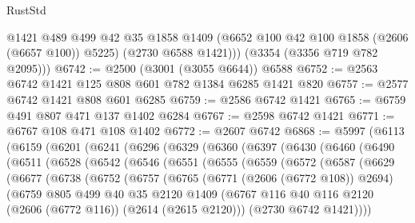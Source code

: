 \begin{lexlean}{RustStd}
\begin{coremodule}
          @1421
          @489
          @499
          @42
          @35
          @1858
          @1409
          (@6652 @100 @42 @100 @1858 (@2606 (@6657 @100)) @5225)
          (@2730 @6588 @1421)))
      (@3354 (@3356 @719 @782 @2095)))
@6742 := @2500 (@3001 (@3055 @6644)) @6588
@6752 := @2563 @6742 @1421 @125 @808 @601 @782 @1384 @6285 @1421 @820
@6757 := @2577 @6742 @1421 @808 @601 @6285
@6759 := @2586 @6742 @1421
@6765 := @6759 @491 @807 @471 @137 @1402 @6284
@6767 := @2598 @6742 @1421
@6771 := @6767 @108 @471 @108 @1402
@6772 := @2607 @6742
@6868 := @5997
    (@6113
      (@6159
        (@6201
          (@6241
            (@6296
              (@6329
                (@6360
                  (@6397
                    (@6430
                      (@6460
                        (@6490
                          (@6511
                            (@6528
                              (@6542
                                (@6546
                                  (@6551
                                    (@6555
                                      (@6559
                                        (@6572
                                          (@6587
                                            (@6629
                                              (@6677
                                                (@6738
                                                  (@6752
                                                    (@6757
                                                      (@6765
                                                        (@6771 (@2606 (@6772 @108)) @2694)
                                                        (@6759
                                                          @805
                                                          @499
                                                          @40
                                                          @35
                                                          @2120
                                                          @1409
                                                          (@6767
                                                            @116
                                                            @40
                                                            @116
                                                            @2120
                                                            (@2606 (@6772 @116))
                                                            (@2614 (@2615 @2120)))
                                                          (@2730 @6742 @1421))))

\end{coremodule}
\end{lexlean}
